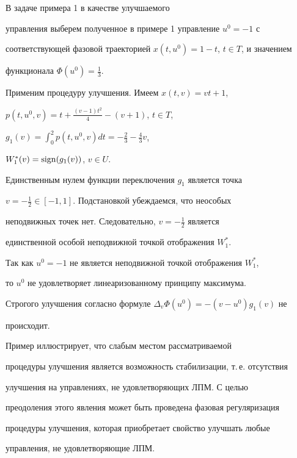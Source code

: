  


\begin{exam} 


 


В задаче примера 1 в качестве улучшаемого 


управления выберем полученное в примере 1 управление $u^0=-1$ с 


соответствующей фазовой траекторией $x(t,u^0)=1-t$, $t\in T$, и значением 


функционала $\Phi(u^0)=\frac{1}{3}$. 


 


Применим процедуру улучшения. Имеем $x(t,v)=v t+1$, 


$p(t,u^0,v)=t+\frac{(v-1)t^2}{4}-(v+1)$, $t\in T$, 


$g_1(v)=\int^2_0p(t,u^0,v)d t=-\frac{2}{3}-\frac{4}{3}v$, 


$W^*_1(v)=\operatorname{sign}(g_1(v))$, $v\in U$. 


 


Единственным нулем функции переключения $g_1$ является точка 


$v=-\frac{1}{2}\in[-1,1]$. Подстановкой убеждаемся, что неособых 


неподвижных точек нет. Следовательно, $v=-\frac{1}{2}$ является 


единственной особой неподвижной точкой отображения $W^*_1$. 


 


Так как $u^0=-1$ не является неподвижной точкой отображения $W^*_1$, 


то $u^0$ не удовлетворяет линеаризованному принципу максимума. 


Строгого улучшения согласно формуле $\Delta_v\Phi(u^0)=-(v-u^0)g_1(v)$ не 


происходит. 


 


Пример иллюстрирует, что слабым местом рассматриваемой 


процедуры улучшения является возможность стабилизации, т.\,е. отсутствия 


улучшения на управлениях, не удовлетворяющих ЛПМ. С целью 


преодоления этого явления может быть проведена фазовая регуляризация 


процедуры улучшения, которая приобретает свойство улучшать любые 


управления, не удовлетворяющие ЛПМ. 


\end{exam} 


